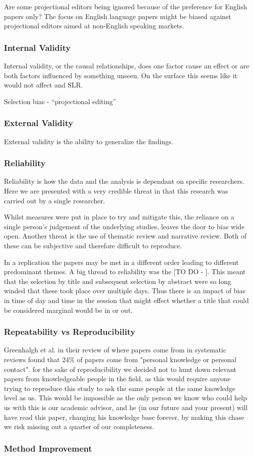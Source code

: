 Are some projectional editors being ignored because of the preference for English papers only?
The focus on English language papers might be biased against projectional editors aimed at non-English speaking markets.


\subsubsection{Internal Validity}
Internal validity, or the causal relationships, does one factor cause an effect or are both factors influenced by something unseen.
On the surface this seems like it would not affect and SLR.


Selection bias - ``projectional editing''

\subsubsection{External Validity}
External validity is the ability to generalize the findings.

\subsubsection{Reliability}
Reliability is how the data and the analysis is dependant on specific researchers.
Here we are presented with a very credible threat in that this research was carried out by a single researcher.

Whilst measures were put in place to try and mitigate this, the reliance on a single person's judgement of the underlying studies, leaves the door to bias wide open.
Another threat is the use of thematic review and narrative review. 
Both of these can be subjective and therefore difficult to reproduce.

In a replication the papers may be met in a different order leading to different predominant themes. 
A big thread to reliability was the [TO DO - ].  
This meant that the selection by title and subsequent selection by abstract were so long winded that these took place over multiple days. 
Thus there is an impact of bias in time of day and time in the session that might effect whether a title that could be considered marginal would be in or out.


\subsubsection{Repeatability vs Reproducibility}
Greenhalgh et al.\cite{GreenhalghTrisha2005Eaeo} in their review of where papers come from in systematic reviews found that 24\% of papers come from "personal knowledge or personal contact".
for the sake of reproducibility we decided not to hunt down relevant papers from knowledgeable people in the field, as this would require anyone trying to reproduce this study to ask the same people at the same knowledge level as us.
This would be impossible as the only person we know who could help us with this is our academic advisor, and he (in our future and your present) will have read this paper, changing his knowledge base forever.
by making this chase we risk missing out a quarter of our completeness.

\subsubsection{Method Improvement}


